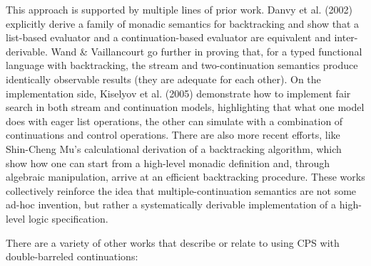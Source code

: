 \documentclass[screen,anonymous,review,draft,natbib=false]{acmart} %
\begin{document}
This approach is supported by multiple lines of prior work. Danvy et al. (2002) explicitly derive a family of monadic semantics for backtracking and show that a list-based evaluator and a continuation-based evaluator are equivalent and inter-derivable. Wand \& Vaillancourt go further in proving that, for a typed functional language with backtracking, the stream and two-continuation semantics produce identically observable results (they are adequate for each other). On the implementation side, Kiselyov et al. (2005) demonstrate how to implement fair search in both stream and continuation models, highlighting that what one model does with eager list operations, the other can simulate with a combination of continuations and control operations. There are also more recent efforts, like Shin-Cheng Mu’s calculational derivation of a backtracking algorithm, which show how one can start from a high-level monadic definition and, through algebraic manipulation, arrive at an efficient backtracking procedure. These works collectively reinforce the idea that multiple-continuation semantics are not some ad-hoc invention, but rather a systematically derivable implementation of a high-level logic specification.

There are a variety of other works that describe or relate to using CPS with double-barreled continuations:






\printbibliography{}
\end{document}
